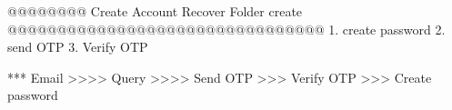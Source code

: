 @@@@@@@@ Create Account Recover Folder create @@@@@@@@@@@@@@@@@@@@@@@@@@@@@@@@
1. create password
2. send OTP 
3. Verify OTP 

*** Email >>>> Query >>>> Send OTP >>> Verify OTP >>> Create password
